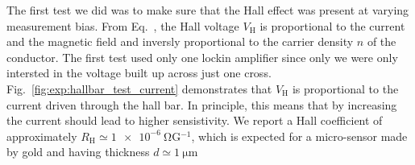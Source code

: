 The first test we did was to make sure that the Hall effect was present at varying measurement bias. From Eq.~, the Hall voltage $V_\textrm{H}$ is proportional to the current and the magnetic field and inversly proportional to the carrier density $n$ of the conductor. The first test used only one lockin amplifier since only we were only intersted in the voltage built up across just one cross. Fig.~\ref{fig:exp:hallbar_test_current} demonstrates that $V_\textrm{H}$ is proportional to the current driven through the hall bar. In principle, this means that by increasing the current should lead to higher sensistivity. We report a Hall coefficient of approximately $R_\textrm{H}\simeq\SI{1e-6}{\ohm}$G$^{-1}$, which is expected for a micro-sensor made by gold and having thickness $d\simeq\SI{1}{\micro\metre}$

